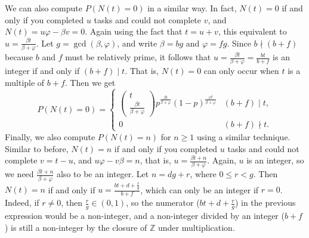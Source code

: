 \documentclass[letterpaper]{article}
\begin{document}
We can also compute $P(N(t){=} 0)$ in a similar way. In fact, $N(t) = 0$ if and only if you completed $u$ tasks and could not complete $v$, and $N(t) = u\varphi - \beta v = 0$. Again using the fact that $t=u+v$, this equivalent to $u = \frac{\beta t}{\beta + \varphi}$. Let $g = \gcd(\beta, \varphi)$, and write $\beta = bg$ and $\varphi = fg$. Since $b \nmid (b+f)$ because $b$ and $f$ must be relatively prime, it follows that $u = \frac{\beta t}{\beta +\varphi} = \frac{bt}{b+f}$ is an integer if and only if $(b+f) \mid t$. That is, $N(t) = 0$ can only occur when $t$ is a multiple of $b+f$. Then we get
\begin{equation*}
	P(N(t)=0) = \begin{cases}
		\left(\begin{matrix}t \\[0.2em]\frac{\beta t}{\beta + \varphi}\end{matrix}\right)p^\frac{\beta t}{\beta+\varphi}(1-p)^\frac{\varphi t}{\beta+\varphi} & (b+f) \mid t, \\
		0 & (b+f)\nmid t.
	\end{cases}
\end{equation*}
Finally, we also compute $P(N(t){=}n)$ for $n \ge 1$ using a similar technique. Similar to before, $N(t) = n$ if and only if you completed $u$ tasks and could not complete $v = t- u$, and $u\varphi - v\beta = n$, that is, $u = \frac{\beta t + n}{\beta + \varphi}$. Again, $u$ is an integer, so we need $\frac{\beta t + n}{\beta + \varphi}$ also to be an integer. Let $n = dg + r$, where $0 \le r < g$. Then $N(t) = n$ if and only if $u = \frac{bt + d + \frac{r}{g}}{b + f}$, which can only be an integer if $r= 0$. Indeed, if $r\ne 0$, then $\frac{r}{g} \in (0,1)$, so the numerator ($bt + d +\frac{r}{g}$) in the previous expression would be a non-integer, and a non-integer divided by an integer ($b+f$) is still a non-integer by the closure of $\mathbb{Z}$ under multiplication.
\end{document}
